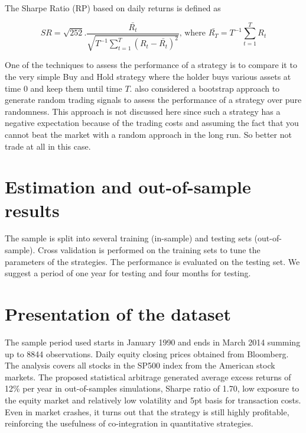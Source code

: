 \documentclass[11pt,a4,twosided,singlespacing,titlepagenumber=on]{scrreprt}
\numberwithin{equation}{chapter} %
\theoremstyle{remark}
\begin{document}
The Sharpe Ratio (RP) based on daily returns is defined as

$$SR =  \sqrt{252 }  . \frac{\bar{R_t}}{\sqrt{T^{-1} \sum_{t=1}^T (R_t - \bar{R_t})^2 }} \text{, where } \bar{R_T} = T^{-1} \sum_{t=1}^T R_t $$

One of the techniques to assess the performance of a strategy is to compare it to the very simple Buy and Hold strategy where the holder buys various assets at time $0$ and keep them until time $T$. \cite{gatev2006} also considered a bootstrap approach to generate random trading signals to assess the performance of a strategy over pure randomness. This approach is not discussed here since such a strategy has a negative expectation because of the trading costs and assuming the fact that you cannot beat the market with a random approach in the long run. So better not trade at all in this case.

\section{Estimation and out-of-sample results}
The sample is split into several training (in-sample) and testing sets (out-of-sample). Cross validation is performed on the training sets to tune the parameters of the strategies. The performance is evaluated on the testing set. We suggest a period of one year for testing and four months for testing.

\section{Presentation of the dataset}
The sample period used starts in January 1990 and ends in March 2014 summing up to 8844 observations. Daily equity closing prices obtained from Bloomberg. The analysis covers all stocks in the SP500 index from the American stock markets. The proposed statistical arbitrage generated average excess returns of 12\% per year in out-of-samples simulations, Sharpe ratio of 1.70, low exposure to the equity market and relatively low volatility and 5pt basis for transaction costs. Even in market crashes, it turns out that the strategy is still highly profitable, reinforcing the usefulness of co-integration in quantitative strategies.
\end{document}
